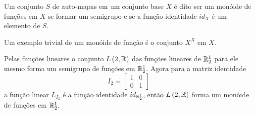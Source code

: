 \begin{definition}
  Um conjunto $S$ de auto-mapas em um conjunto base $X$ é dito ser um monóide de funções em $X$ se formar um semigrupo e se a função identidade $id_{X}$ é um elemento de $S$.
\end{definition}
Um exemplo trivial de um monóide de função é o conjunto $X^X$ em $X$.
\begin{exmp}
Pelas funções lineares o conjunto $L\left(2,\mathbb{R}\right)$ das funções lineares de $\mathbb{R}_{2}^{1}$ para ele mesmo forma um semigrupo de funções em $\mathbb{R}_{2}^{1}$. Agora para a matriz identidade
$$I_{2} = \begin{bmatrix}
    1 & 0\\
    0 & 1
  \end{bmatrix}
$$
a função linear $L_{I_{2}}$ é a função identidade $id_{\mathbb{R}_{2}^{1}}$, então $L\left(2,\mathbb{R}\right)$ forma um monóide de funções em $\mathbb{R}_{2}^{1}.$
\end{exmp}

